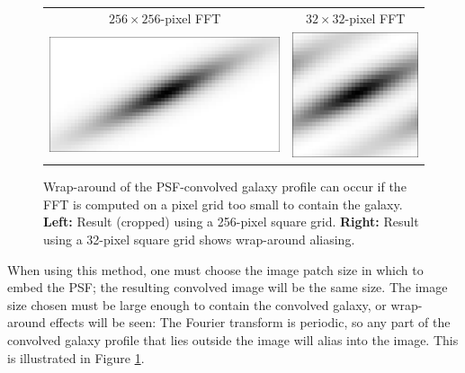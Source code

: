 \documentclass[11pt,preprint]{aastex}
\newcommand{\trick}{method}
\begin{document}
\begin{figure}
\begin{center}
\begin{tabular}{@{}cc@{}}
  $256 \times 256$-pixel FFT &
  $32 \times 32$-pixel FFT \\
  \includegraphics[height=0.22\textwidth]{gal-00} &
  \includegraphics[height=0.22\textwidth]{gal-01} \\
\end{tabular}
\end{center}
\caption{\label{fig:wrap}%
  Wrap-around of the PSF-convolved galaxy profile can occur if the FFT is
  computed on a pixel grid too small to contain the galaxy.
  \textbf{Left:} Result (cropped) using a 256-pixel square grid.
  \textbf{Right:} Result using a 32-pixel square grid shows wrap-around
  aliasing.
}
\end{figure}

When using this \trick, one must choose the image patch size in which
to embed the PSF; the resulting convolved image will be the same size.
The image size chosen must be large enough to contain the convolved
galaxy, or wrap-around effects will be seen: The Fourier transform is
periodic, so any part of the convolved galaxy profile that lies
outside the image will alias into the image.  This is
illustrated in Figure \ref{fig:wrap}.


\end{document}
